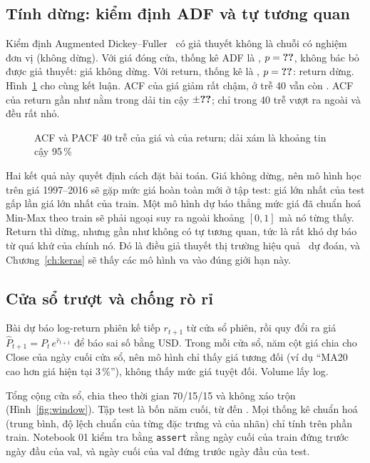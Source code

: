 \subsection{Tính dừng: kiểm định ADF và tự tương quan}

Kiểm định Augmented Dickey--Fuller~\cite{dickey1979} có giả thuyết không là chuỗi có nghiệm đơn vị (không dừng).
Với giá đóng cửa, thống kê ADF là , $p = \SL{amzn/adf/close/p}$, không bác bỏ được giả thuyết:
giá không dừng. Với return, thống kê là , $p = \SL{amzn/adf/return/p}$: return dừng.
Hình~\ref{fig:acf} cho cùng kết luận. ACF của giá giảm rất chậm, ở trễ 40 vẫn còn . ACF của return
gần như nằm trong dải tin cậy $\pm\SL{amzn/acf_band}$; chỉ  trong 40 trễ vượt ra ngoài và đều rất
nhỏ.

\begin{figure}[H]
  \centering
  \caption{ACF và PACF 40 trễ của giá và của return; dải xám là khoảng tin cậy 95\,\%}
  \label{fig:acf}
\end{figure}

Hai kết quả này quyết định cách đặt bài toán. Giá không dừng, nên mô hình học trên giá 1997--2016 sẽ gặp mức giá hoàn
toàn mới ở tập test: giá lớn nhất của test gấp  lần giá lớn nhất của train. Một mô hình dự báo
thẳng mức giá đã chuẩn hoá Min-Max theo train sẽ phải ngoại suy ra ngoài khoảng $[0, 1]$ mà nó từng thấy. Return thì
dừng, nhưng gần như không có tự tương quan, tức là rất khó dự báo từ quá khứ của chính nó. Đó là điều giả thuyết thị
trường hiệu quả~\cite{fama1970} dự đoán, và Chương~\ref{ch:keras} sẽ thấy các mô hình va vào đúng giới hạn này.

\subsection{Cửa sổ trượt và chống rò rỉ}

Bài dự báo log-return phiên kế tiếp $r_{t+1}$ từ cửa sổ  phiên, rồi quy đổi ra giá
$\hat P_{t+1} = P_t\, e^{\hat r_{t+1}}$ để báo sai số bằng USD. Trong mỗi cửa sổ, năm cột giá chia cho Close của ngày
cuối cửa sổ, nên mô hình chỉ thấy giá tương đối (ví dụ ``MA20 cao hơn giá hiện tại 3\,\%''), không thấy mức giá tuyệt đối.
Volume lấy log.


Tổng cộng  cửa sổ, chia theo thời gian 70/15/15 và không xáo trộn (Hình~\ref{fig:window}). Tập
test là bốn năm cuối, từ  đến . Mọi thống kê chuẩn hoá (trung bình, độ
lệch chuẩn của từng đặc trưng và của nhãn) chỉ tính trên phần train. Notebook 01 kiểm tra bằng \texttt{assert} rằng ngày
cuối của train đứng trước ngày đầu của val, và ngày cuối của val đứng trước ngày đầu của test.


